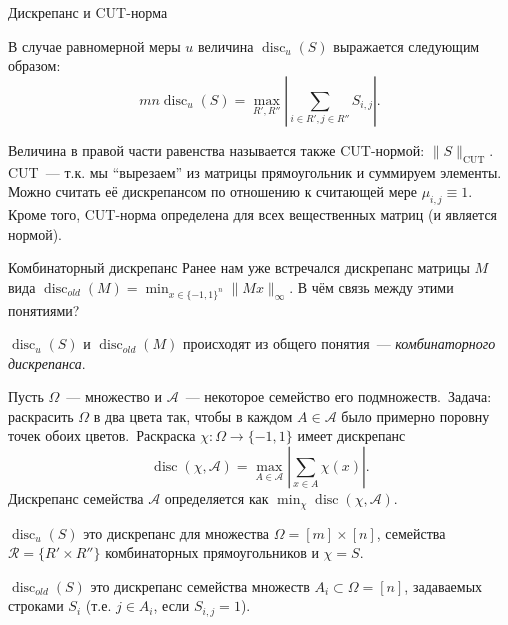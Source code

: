 \documentclass[handout]{beamer}
\DeclareMathOperator{\disc}{disc}
\begin{document}
\begin{frame}{Дискрепанс и CUT-норма}

    В случае равномерной меры $u$ величина $\disc_u(S)$ выражается следующим
    образом:
    $$
    mn\disc_u(S) = \max_{R',R''}|\sum_{i\in R',j\in R''}S_{i,j}|.
    $$
    \pause

    Величина в правой части равенства называется также CUT-нормой:
    $\|S\|_{\mathrm{CUT}}$. CUT~--- т.к. мы ``вырезаем'' из матрицы
    прямоугольник и суммируем элементы. Можно считать её дискрепансом по
    отношению к считающей мере $\mu_{i,j}\equiv1$. Кроме того, CUT-норма
    определена для всех вещественных матриц (и является нормой).

\end{frame}
\begin{frame}{Комбинаторный дискрепанс}
    Ранее нам уже встречался дискрепанс матрицы $M$ вида
    $\disc_{old}(M) = \min_{x\in\{-1,1\}^n}\|Mx\|_\infty$. В чём связь между этими понятиями?
    \pause

    $\disc_u(S)$ и $\disc_{old}(M)$ происходят из общего понятия~---
    \textit{комбинаторного дискрепанса}.\pause
    
    Пусть $\Omega$~--- множество и
    $\mathcal A$~--- некоторое семейство его
    подмножеств.\pause~Задача: раскрасить $\Omega$ в два цвета так, чтобы в
    каждом $A\in\mathcal A$ было примерно поровну точек обоих
    цветов.\pause~Раскраска $\chi\colon\Omega\to\{-1,1\}$ имеет дискрепанс
    $$
    \disc(\chi,\mathcal A) = \max_{A\in\mathcal A}|\sum_{x\in A}\chi(x)|.
    $$
    \pause
    Дискрепанс семейства $\mathcal A$ определяется как
    $\min_\chi\disc(\chi,\mathcal A)$.
    \pause\vspace{5pt}

    $\disc_u(S)$ это дискрепанс для множества $\Omega = [m]\times[n]$,
    семейства $\mathcal R=\{R'\times R''\}$ комбинаторных прямоугольников и
    $\chi=S$.
    \pause\vspace{5pt}

    $\disc_{old}(S)$ это дискрепанс  семейства множеств
    $A_i\subset \Omega = [n]$, задаваемых строками $S_i$ (т.е. $j\in A_i$, если $S_{i,j}=1$).
\end{frame}
\end{document}

